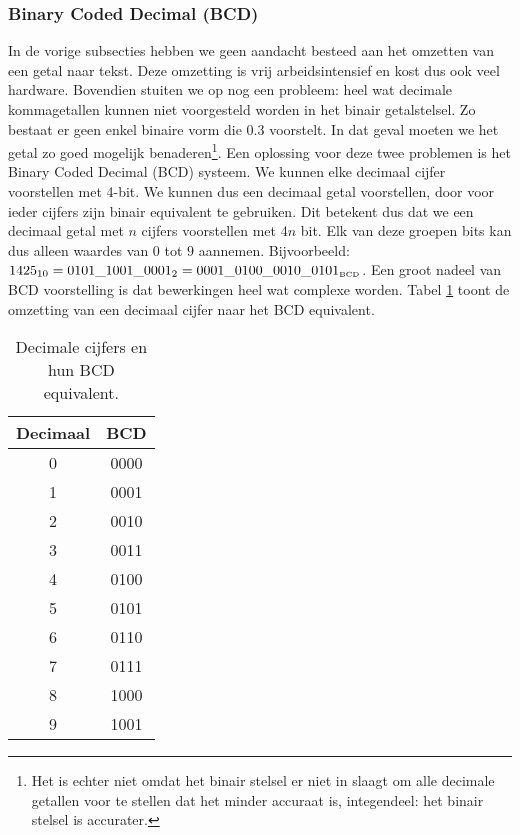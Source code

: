 \subsubsection{Binary Coded Decimal (BCD)}
In de vorige subsecties hebben we geen aandacht besteed aan het omzetten van een getal naar tekst. Deze omzetting is vrij arbeidsintensief en kost dus ook veel hardware. Bovendien stuiten we op nog een probleem: heel wat decimale kommagetallen kunnen niet voorgesteld worden in het binair getalstelsel. Zo bestaat er geen enkel binaire vorm die $0.3$ voorstelt. In dat geval moeten we het getal zo goed mogelijk benaderen\footnote{Het is echter niet omdat het binair stelsel er niet in slaagt om alle decimale getallen voor te stellen dat het minder accuraat is, integendeel: het binair stelsel is accurater.}. Een oplossing voor deze twee problemen is het Binary Coded Decimal (BCD) systeem. We kunnen elke decimaal cijfer voorstellen met 4-bit. We kunnen dus een decimaal getal voorstellen, door voor ieder cijfers zijn binair equivalent te gebruiken. Dit betekent dus dat we een decimaal getal met $n$ cijfers voorstellen met $4n$ bit. Elk van deze groepen bits kan dus alleen waardes van $0$ tot $9$ aannemen. Bijvoorbeeld: $1425_{10}=0101\_1001\_0001_2=0001\_0100\_0010\_0101_{\mbox{\tiny{BCD}}}$. Een groot nadeel van BCD voorstelling is dat bewerkingen heel wat complexe worden. Tabel \ref{tbl:bCDConversion} toont de omzetting van een decimaal cijfer naar het BCD equivalent.
\begin{table}[hbt]
\centering
\begin{tabular}{c|c}
Decimaal&BCD\\\hline
0&0000\\
1&0001\\
2&0010\\
3&0011\\
4&0100\\
5&0101\\
6&0110\\
7&0111\\
8&1000\\
9&1001
\end{tabular}
\caption{Decimale cijfers en hun BCD equivalent.}
\label{tbl:bCDConversion}
\end{table}
